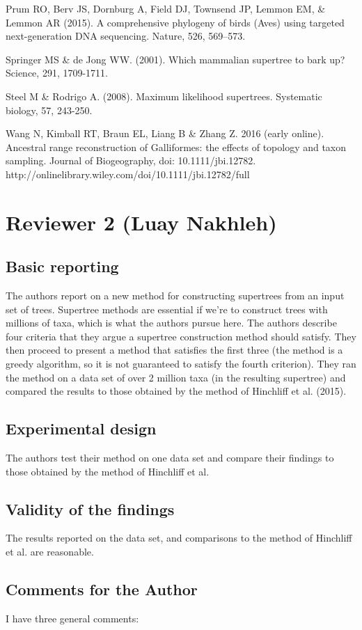 \documentclass{article}
\begin{document}
Prum RO, Berv JS, Dornburg A, Field DJ, Townsend JP, Lemmon EM, \& Lemmon AR (2015). A comprehensive phylogeny of birds (Aves) using targeted next-generation DNA sequencing. Nature, 526, 569–573.

Springer MS \& de Jong WW. (2001). Which mammalian supertree to bark up? Science, 291, 1709-1711.

Steel M \& Rodrigo A. (2008). Maximum likelihood supertrees. Systematic biology, 57, 243-250.

Wang N, Kimball RT, Braun EL, Liang B \& Zhang Z. 2016 (early online). Ancestral range reconstruction of Galliformes: the effects of topology and taxon sampling. Journal of Biogeography, doi: 10.1111/jbi.12782. http://onlinelibrary.wiley.com/doi/10.1111/jbi.12782/full 


\newpage
\section*{Reviewer 2 (Luay Nakhleh)}
\subsection*{Basic reporting}
The authors report on a new method for constructing supertrees from an input set of trees. Supertree methods are essential if we're to construct trees with millions of taxa, which is what the authors pursue here. The authors describe four criteria that they argue a supertree construction method should satisfy. They then proceed to present a method that satisfies the first three (the method is a greedy algorithm, so it is not guaranteed to satisfy the fourth criterion). They ran the method on a data set of over 2 million taxa (in the resulting supertree) and compared the results to those obtained by the method of Hinchliff et al. (2015).
\subsection*{Experimental design}
The authors test their method on one data set and compare their findings to those obtained by the method of Hinchliff et al.
\subsection*{Validity of the findings}
The results reported on the data set, and comparisons to the method of Hinchliff et al. are reasonable.
\subsection*{Comments for the Author}
I have three general comments:
\end{document}
